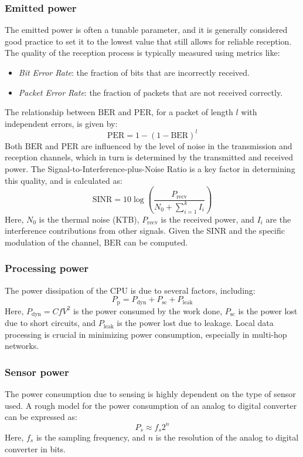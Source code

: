 \subsubsection{Emitted power}
The emitted power is often a tunable parameter, and it is generally considered good practice to set it to the lowest value that still allows for reliable reception. 
The quality of the reception process is typically measured using metrics like:
\begin{itemize}
    \item \textit{Bit Error Rate}: the fraction of bits that are incorrectly received. 
    \item \textit{Packet Error Rate}: the fraction of packets that are not received correctly.
\end{itemize}
The relationship between $\text{BER}$ and $\text{PER}$, for a packet of length $l$ with independent errors, is given by:
\[\text{PER}=1-(1-\text{BER})^l\]
Both $\text{BER}$ and $\text{PER}$ are influenced by the level of noise in the transmission and reception channels, which in turn is determined by the transmitted and received power. 
The Signal-to-Interference-plus-Noise Ratio is a key factor in determining this quality, and is calculated as:
\[\text{SINR}=10\log\left(\dfrac{P_{\text{recv}}}{N_0+\sum_{i=1}^{k}I_i}\right)\]
Here, $N_0$ is the thermal noise (KTB), $P_{\text{recv}}$ is the received power, and $I_i$ are the interference contributions from other signals.
Given the SINR and the specific modulation of the channel, $\text{BER}$ can be computed.

\subsubsection{Processing power}
The power dissipation of the CPU is due to several factors, including:
\[P_{\text{p}}=P_{\text{dyn}}+P_{\text{sc}}+P_{\text{leak}}\]
Here, $P_{\text{dyn}}=CfV^2$ is the power consumed by the work done, $P_{\text{sc}}$ is the power lost due to short circuits, and $P_{\text{leak}}$ is the power lost due to leakage.
Local data processing is crucial in minimizing power consumption, especially in multi-hop networks.

\subsubsection{Sensor power}
The power consumption due to sensing is highly dependent on the type of sensor used. 
A rough model for the power consumption of an analog to digital converter can be expressed as:
\[P_s\approx f_s2^n\]
\noindent Here, $f_s$ is the sampling frequency, and $n$ is the resolution of the analog to digital converter in bits.